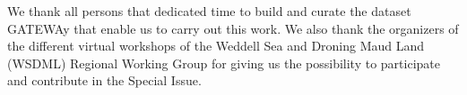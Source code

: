 \documentclass[gc, manuscript]{copernicus}
\begin{document}
\begin{acknowledgements}
We thank all persons that dedicated time to build and curate the dataset
GATEWAy that enable us to carry out this work. We also thank the
organizers of the different virtual workshops of the Weddell Sea and
Droning Maud Land (WSDML) Regional Working Group for giving us the
possibility to participate and contribute in the Special Issue.
\end{acknowledgements}







\end{document}
